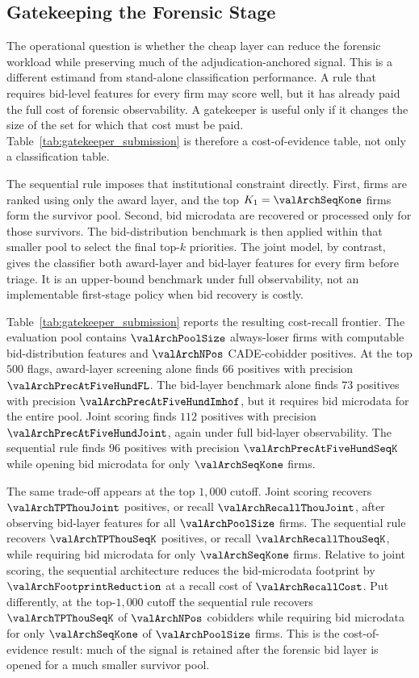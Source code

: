 \subsection{Gatekeeping the Forensic Stage}
\label{sec:sequential_gatekeeper}

The operational question is whether the cheap layer can reduce
the forensic workload while preserving much of the
adjudication-anchored signal. This is a different estimand from
stand-alone classification performance. A rule that requires
bid-level features for every firm may score well, but it has
already paid the full cost of forensic observability. A
gatekeeper is useful only if it changes the size of the set for
which that cost must be paid.
Table~\ref{tab:gatekeeper_submission} is therefore a
cost-of-evidence table, not only a classification table.

The sequential rule imposes that institutional constraint
directly. First, firms are ranked using only the award layer, and
the top $K_1=\valArchSeqKone$ firms form the survivor pool.
Second, bid microdata are recovered or processed only for those
survivors. The bid-distribution benchmark is then applied within
that smaller pool to select the final top-$k$ priorities. The
joint model, by contrast, gives the classifier both award-layer
and bid-layer features for every firm before triage. It is an
upper-bound benchmark under full observability, not an
implementable first-stage policy when bid recovery is costly.

Table~\ref{tab:gatekeeper_submission} reports the resulting
cost-recall frontier. The evaluation pool contains
$\valArchPoolSize$ always-loser firms with computable
bid-distribution features and $\valArchNPos$ CADE-cobidder
positives. At the top $500$ flags, award-layer screening alone
finds $66$ positives with precision $\valArchPrecAtFiveHundFL$.
The bid-layer benchmark alone finds $73$ positives with precision
$\valArchPrecAtFiveHundImhof$, but it requires bid microdata for
the entire pool. Joint scoring finds $112$ positives with
precision $\valArchPrecAtFiveHundJoint$, again under full
bid-layer observability. The sequential rule finds $96$
positives with precision $\valArchPrecAtFiveHundSeqK$ while
opening bid microdata for only $\valArchSeqKone$ firms.

The same trade-off appears at the top $1{,}000$ cutoff. Joint
scoring recovers $\valArchTPThouJoint$ positives, or recall
$\valArchRecallThouJoint$, after observing bid-layer features
for all $\valArchPoolSize$ firms. The sequential rule recovers
$\valArchTPThouSeqK$ positives, or recall
$\valArchRecallThouSeqK$, while requiring bid microdata for only
$\valArchSeqKone$ firms. Relative to joint scoring, the
sequential architecture reduces the bid-microdata footprint by
$\valArchFootprintReduction$ at a recall cost of
$\valArchRecallCost$. Put differently, at the top-$1{,}000$
cutoff the sequential rule recovers $\valArchTPThouSeqK$ of
$\valArchNPos$ cobidders while requiring bid microdata for only
$\valArchSeqKone$ of $\valArchPoolSize$ firms. This is the
cost-of-evidence result: much of the signal is retained after
the forensic bid layer is opened for a much smaller survivor
pool.

